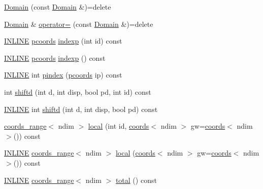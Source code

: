 \begin{DoxyCompactItemize}
\hyperlink{classshark_1_1ndim_1_1_domain_abda6ddc2b302fd3a7012a2f52bdaff40}{Domain} (const \hyperlink{classshark_1_1ndim_1_1_domain}{Domain} \&)=delete
\item 
\hyperlink{classshark_1_1ndim_1_1_domain}{Domain} \& \hyperlink{classshark_1_1ndim_1_1_domain_a24484e5bc50ca9907904896eaf20a820}{operator=} (const \hyperlink{classshark_1_1ndim_1_1_domain}{Domain} \&)=delete
\item 
\hyperlink{common_8hpp_a2eb6f9e0395b47b8d5e3eeae4fe0c116}{I\+N\+L\+I\+NE} \hyperlink{classshark_1_1ndim_1_1_domain_a9684ccd8af33cff7639c782290ac37ee}{pcoords} \hyperlink{classshark_1_1ndim_1_1_domain_a0b21c5f42bd40695f8fc6978ff898bf4}{indexp} (int id) const
\item 
\hyperlink{common_8hpp_a2eb6f9e0395b47b8d5e3eeae4fe0c116}{I\+N\+L\+I\+NE} \hyperlink{classshark_1_1ndim_1_1_domain_a9684ccd8af33cff7639c782290ac37ee}{pcoords} \hyperlink{classshark_1_1ndim_1_1_domain_ab8a7d1fa990b118f316f1e630e86b203}{indexp} () const
\item 
\hyperlink{common_8hpp_a2eb6f9e0395b47b8d5e3eeae4fe0c116}{I\+N\+L\+I\+NE} int \hyperlink{classshark_1_1ndim_1_1_domain_ad22dcae5c29d3d20dc279930b9423853}{pindex} (\hyperlink{classshark_1_1ndim_1_1_domain_a9684ccd8af33cff7639c782290ac37ee}{pcoords} ip) const
\item 
int \hyperlink{classshark_1_1ndim_1_1_domain_ae6830337d8bdd203b5267ce7666362b0}{shiftd} (int d, int disp, bool pd, int id) const
\item 
\hyperlink{common_8hpp_a2eb6f9e0395b47b8d5e3eeae4fe0c116}{I\+N\+L\+I\+NE} int \hyperlink{classshark_1_1ndim_1_1_domain_ac08b32ef1496aeccc639f1106bfa6355}{shiftd} (int d, int disp, bool pd) const
\item 
\hyperlink{structshark_1_1ndim_1_1coords__range}{coords\+\_\+range}$<$ ndim $>$ \hyperlink{classshark_1_1ndim_1_1_domain_a3351db56f9d6bd22ba473d744e3f7025}{local} (int id, \hyperlink{structshark_1_1ndim_1_1coords}{coords}$<$ ndim $>$ gw=\hyperlink{structshark_1_1ndim_1_1coords}{coords}$<$ ndim $>$()) const
\item 
\hyperlink{common_8hpp_a2eb6f9e0395b47b8d5e3eeae4fe0c116}{I\+N\+L\+I\+NE} \hyperlink{structshark_1_1ndim_1_1coords__range}{coords\+\_\+range}$<$ ndim $>$ \hyperlink{classshark_1_1ndim_1_1_domain_acaf625c94a4f874d55f5989ece9dda9e}{local} (\hyperlink{structshark_1_1ndim_1_1coords}{coords}$<$ ndim $>$ gw=\hyperlink{structshark_1_1ndim_1_1coords}{coords}$<$ ndim $>$()) const
\item 
\hyperlink{common_8hpp_a2eb6f9e0395b47b8d5e3eeae4fe0c116}{I\+N\+L\+I\+NE} \hyperlink{structshark_1_1ndim_1_1coords__range}{coords\+\_\+range}$<$ ndim $>$ \hyperlink{classshark_1_1ndim_1_1_domain_ae4357c99519b3efbaf2544828629de87}{total} () const

\end{DoxyCompactItemize}
